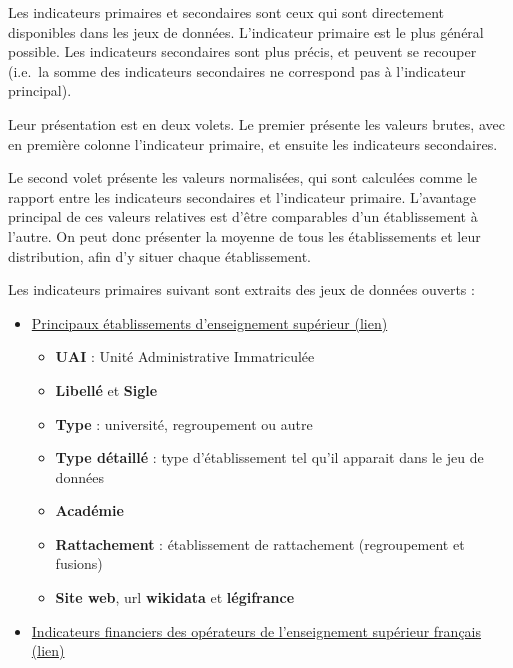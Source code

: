 \documentclass[12pt,french,landscape]{article}
\providecommand{\tightlist}{%
  \setlength{\itemsep}{0pt}\setlength{\parskip}{0pt}}
\begin{document}
\begin{multicols}{2}
Les indicateurs primaires et secondaires sont ceux qui sont directement
disponibles dans les jeux de données. L'indicateur primaire est le plus
général possible. Les indicateurs secondaires sont plus précis, et
peuvent se recouper (i.e.~la somme des indicateurs secondaires ne
correspond pas à l'indicateur principal).

Leur présentation est en deux volets. Le premier présente les valeurs
brutes, avec en première colonne l'indicateur primaire, et ensuite les
indicateurs secondaires.

Le second volet présente les valeurs normalisées, qui sont calculées
comme le rapport entre les indicateurs secondaires et l'indicateur
primaire. L'avantage principal de ces valeurs relatives est d'être
comparables d'un établissement à l'autre. On peut donc présenter la
moyenne de tous les établissements et leur distribution, afin d'y situer
chaque établissement.

Les indicateurs primaires suivant sont extraits des jeux de données
ouverts :

\begin{itemize}
\tightlist
\item
  \href{https://data.enseignementsup-recherche.gouv.fr/explore/dataset/fr-esr-principaux-etablissements-enseignement-superieur/}{Principaux
  établissements d'enseignement supérieur (lien)}

  \begin{itemize}
  \tightlist
  \item
    \textbf{UAI} : Unité Administrative Immatriculée
  \item
    \textbf{Libellé} et \textbf{Sigle}
  \item
    \textbf{Type} : université, regroupement ou autre
  \item
    \textbf{Type détaillé} : type d'établissement tel qu'il apparait
    dans le jeu de données
  \item
    \textbf{Académie}
  \item
    \textbf{Rattachement} : établissement de rattachement (regroupement
    et fusions)
  \item
    \textbf{Site web}, url \textbf{wikidata} et \textbf{légifrance}
  \end{itemize}
\item
  \href{https://data.enseignementsup-recherche.gouv.fr/explore/dataset/fr-esr-operateurs-indicateurs-financiers/}{Indicateurs
  financiers des opérateurs de l'enseignement supérieur français (lien)}


\end{itemize}
\end{multicols}
\end{document}
